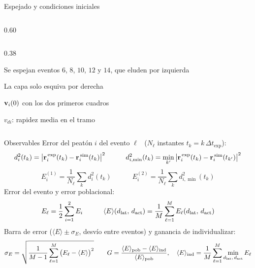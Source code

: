 \begin{frame}{Espejado y condiciones iniciales}
  \begin{cols}
    \begin{column}{0.60\textwidth}
    \end{column}
    \begin{column}{0.38\textwidth}
      \begin{parametros}[Evento 14]
        \item Se espejan eventos $6$, $8$, $10$, $12$ y $14$, que eluden por izquierda
        \item La capa solo esquiva por derecha
      \end{parametros}
      \vspace{4pt}
      \begin{parametros}
        \item $\mathbf{v}_i(0)$ con los dos primeros cuadros
        \item $v_{di}$: rapidez media en el tramo
      \end{parametros}
    \end{column}
  \end{cols}
\end{frame}

\begin{frame}{Observables}
  Error del peatón $i$ del evento $\ell$ \ ($N_\ell$ instantes $t_k = k\,\Delta t_{\mathrm{exp}}$):
  \[
    d^2_i(t_k) = \big|\mathbf{r}^{\,\mathrm{exp}}_i(t_k) - \mathbf{r}^{\,\mathrm{sim}}_i(t_k)\big|^2
    \qquad\quad
    d^2_{i,\min}(t_k) = \min_{k'}\big|\mathbf{r}^{\,\mathrm{exp}}_i(t_k) - \mathbf{r}^{\,\mathrm{sim}}_i(t_{k'})\big|^2
  \]
  \[
    \boxed{E^{(1)}_i = \frac{1}{N_\ell}\sum_{k} d^2_i(t_k)}
    \qquad\quad
    \boxed{E^{(2)}_i = \frac{1}{N_\ell}\sum_{k} d^2_{i,\min}(t_k)}
  \]
  \vspace{2pt}
  Error del evento y error poblacional:
  \[
    E_\ell = \frac{1}{2}\sum_{i=1}^{2} E_i
    \qquad\quad
    \langle E\rangle(d_{\mathrm{lat}},\,d_{\mathrm{act}}) = \frac{1}{M}\sum_{\ell=1}^{M} E_\ell(d_{\mathrm{lat}},\,d_{\mathrm{act}})
  \]
  \vspace{2pt}
  Barra de error ($\langle E\rangle \pm \sigma_E$, desvío entre eventos) y ganancia de individualizar:
  \[
    \sigma_E = \sqrt{\frac{1}{M-1}\sum_{\ell=1}^{M}\big(E_\ell - \langle E\rangle\big)^2}
    \qquad
    G = \frac{\langle E\rangle_{\mathrm{pob}} - \langle E\rangle_{\mathrm{ind}}}{\langle E\rangle_{\mathrm{pob}}},
    \quad
    \langle E\rangle_{\mathrm{ind}} = \frac{1}{M}\sum_{\ell=1}^{M}\min_{d_{\mathrm{lat}},\,d_{\mathrm{act}}} E_\ell
  \]
\end{frame}

